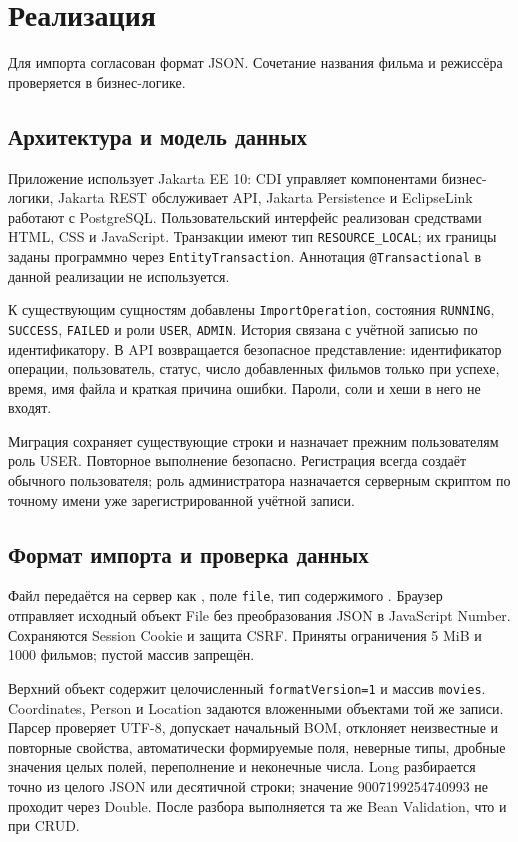 \section{Реализация}
Для импорта согласован формат JSON. Сочетание названия фильма и режиссёра проверяется в бизнес-логике.

\subsection{Архитектура и модель данных}
Приложение использует Jakarta EE 10: CDI управляет компонентами бизнес-логики, Jakarta REST обслуживает API, Jakarta Persistence и EclipseLink работают с PostgreSQL. Пользовательский интерфейс реализован средствами HTML, CSS и JavaScript. Транзакции имеют тип \texttt{RESOURCE\_LOCAL}; их границы заданы программно через \texttt{EntityTransaction}. Аннотация \texttt{@Transactional} в данной реализации не используется.

К существующим сущностям добавлены \texttt{ImportOperation}, состояния \texttt{RUNNING}, \texttt{SUCCESS}, \texttt{FAILED} и роли \texttt{USER}, \texttt{ADMIN}. История связана с учётной записью по идентификатору. В API возвращается безопасное представление: идентификатор операции, пользователь, статус, число добавленных фильмов только при успехе, время, имя файла и краткая причина ошибки. Пароли, соли и хеши в него не входят.

Миграция  сохраняет существующие строки и назначает прежним пользователям роль USER. Повторное выполнение безопасно. Регистрация всегда создаёт обычного пользователя; роль администратора назначается серверным скриптом по точному имени уже зарегистрированной учётной записи.

\subsection{Формат импорта и проверка данных}
Файл передаётся на сервер как , поле \texttt{file}, тип содержимого . Браузер отправляет исходный объект File без преобразования JSON в JavaScript Number. Сохраняются Session Cookie и защита CSRF. Приняты ограничения 5 MiB и 1000 фильмов; пустой массив запрещён.

Верхний объект содержит целочисленный \texttt{formatVersion=1} и массив \texttt{movies}. Coordinates, Person и Location задаются вложенными объектами той же записи. Парсер проверяет UTF-8, допускает начальный BOM, отклоняет неизвестные и повторные свойства, автоматически формируемые поля, неверные типы, дробные значения целых полей, переполнение и неконечные числа. Long разбирается точно из целого JSON или десятичной строки; значение 9007199254740993 не проходит через Double. После разбора выполняется та же Bean Validation, что и при CRUD.

